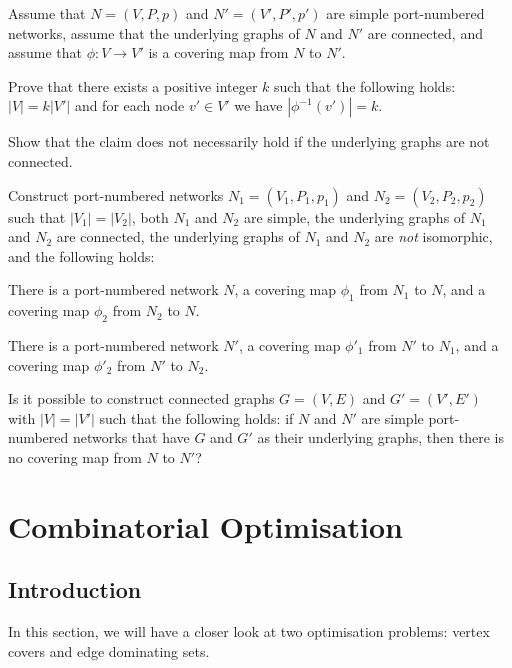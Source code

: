 \begin{ex}
    Assume that $N = (V,P,p)$ and $N' = (V'\!,P'\!,p')$ are simple port-numbered networks,
    assume that the underlying graphs of $N$ and $N'$ are connected, and
    assume that $\phi\colon V \to V'$ is a covering map from $N$ to $N'$.

    Prove that there exists a positive integer $k$ such that the following holds:
    $|V| = k |V'|$ and for each node $v' \in V'$ we have $|\phi^{-1}(v')| = k$.

    Show that the claim does not necessarily hold if the underlying graphs are not connected.
\end{ex}

\begin{ex}[isomorphisms]
    Construct port-numbered networks $N_1 \allowbreak = (V_1,P_1,p_1)$ and $N_2 = (V_2,P_2,p_2)$ such that $|V_1| = |V_2|$, both $N_1$ and $N_2$ are simple, the underlying graphs of $N_1$ and $N_2$ are connected, the underlying graphs of $N_1$ and $N_2$ are \emph{not} isomorphic, and the following holds:
    \begin{subex}
        \item There is a port-numbered network $N$, a covering map $\phi_1$ from $N_1$ to $N$, and a covering map $\phi_2$ from $N_2$ to $N$.
        \item There is a port-numbered network $N'$, a covering map $\phi'_1$ from $N'$ to $N_1$, and a covering map $\phi'_2$ from $N'$ to $N_2$.
    \end{subex}
\end{ex}

\begin{ex}
    Is it possible to construct connected  graphs $G = (V,E)$ and $G' = (V'\!,E')$ with $|V| = |V'|$ such that the following holds: if $N$ and $N'$ are simple port-numbered networks that have $G$ and $G'$ as their underlying graphs, then there is no covering map from $N$ to $N'$?
\end{ex}


\chapter{Combinatorial Optimisation}

\section{Introduction}

In this section, we will have a closer look at two optimisation problems: vertex covers and edge dominating sets.

